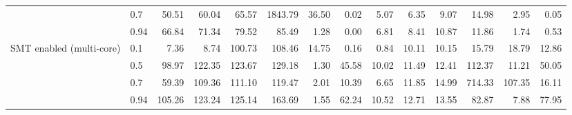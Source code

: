 \begin{table}
{\begin{tabular}{llrrrrrrrrrrrr}
 & 0.7 & 50.51 & 60.04 & 65.57 & 1843.79 & 36.50 & 0.02 & 5.07 & 6.35 & 9.07 & 14.98 & 2.95 & 0.05 \\
 & 0.94 & 66.84 & 71.34 & 79.52 & 85.49 & 1.28 & 0.00 & 6.81 & 8.41 & 10.87 & 11.86 & 1.74 & 0.53 \\
\cmidrule{1-14}
\multirow[t]{4}{*}{SMT enabled (multi-core)} & 0.1 & 7.36 & 8.74 & 100.73 & 108.46 & 14.75 & 0.16 & 0.84 & 10.11 & 10.15 & 15.79 & 18.79 & 12.86 \\
 & 0.5 & 98.97 & 122.35 & 123.67 & 129.18 & 1.30 & 45.58 & 10.02 & 11.49 & 12.41 & 112.37 & 11.21 & 50.05 \\
 & 0.7 & 59.39 & 109.36 & 111.10 & 119.47 & 2.01 & 10.39 & 6.65 & 11.85 & 14.99 & 714.33 & 107.35 & 16.11 \\
 & 0.94 & 105.26 & 123.24 & 125.14 & 163.69 & 1.55 & 62.24 & 10.52 & 12.71 & 13.55 & 82.87 & 7.88 & 77.95 \\
\cmidrule{1-14}
\bottomrule
\end{tabular}%
}
\end{table}
